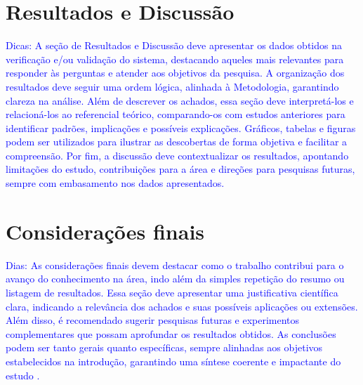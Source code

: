 \documentclass[
	article,			%
	11pt,				%
	oneside,			%
	a4paper,			%
	english,			%
	brazil,				%
	sumario=tradicional
]{abntex2}
\begin{document}
\section{Resultados e Discussão}

\textcolor{blue}{
Dicas: A seção de Resultados e Discussão deve apresentar os dados obtidos na
verificação e/ou validação do sistema, destacando aqueles mais relevantes para
responder às perguntas e atender aos objetivos da pesquisa. A organização dos
resultados deve seguir uma ordem lógica, alinhada à Metodologia, garantindo
clareza na análise. Além de descrever os achados, essa seção deve interpretá-los
e relacioná-los ao referencial teórico, comparando-os com estudos anteriores
para identificar padrões, implicações e possíveis explicações. Gráficos, tabelas
e figuras podem ser utilizados para ilustrar as descobertas de forma objetiva e
facilitar a compreensão. Por fim, a discussão deve contextualizar os resultados,
apontando limitações do estudo, contribuições para a área e direções para
pesquisas futuras, sempre com embasamento nos dados apresentados.
}

\section{Considerações finais}

\textcolor{blue}{
Dias: As considerações finais devem destacar como o trabalho contribui para o
avanço do conhecimento na área, indo além da simples repetição do resumo ou
listagem de resultados. Essa seção deve apresentar uma justificativa científica
clara, indicando a relevância dos achados e suas possíveis aplicações ou
extensões. Além disso, é recomendado sugerir pesquisas futuras e experimentos
complementares que possam aprofundar os resultados obtidos. As conclusões podem
ser tanto gerais quanto específicas, sempre alinhadas aos objetivos
estabelecidos na introdução, garantindo uma síntese coerente e impactante do
estudo \cite{Elsevier2025}.
}


\end{document}
